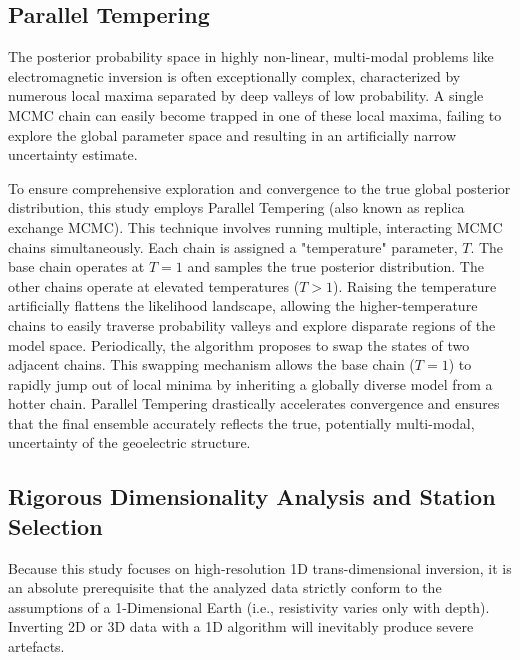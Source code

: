 \subsection{Parallel Tempering}
The posterior probability space in highly non-linear, multi-modal problems like electromagnetic inversion is often exceptionally complex, characterized by numerous local maxima separated by deep valleys of low probability. A single MCMC chain can easily become trapped in one of these local maxima, failing to explore the global parameter space and resulting in an artificially narrow uncertainty estimate.

To ensure comprehensive exploration and convergence to the true global posterior distribution, this study employs Parallel Tempering (also known as replica exchange MCMC). This technique involves running multiple, interacting MCMC chains simultaneously. Each chain is assigned a "temperature" parameter, $T$. The base chain operates at $T=1$ and samples the true posterior distribution. The other chains operate at elevated temperatures ($T > 1$). Raising the temperature artificially flattens the likelihood landscape, allowing the higher-temperature chains to easily traverse probability valleys and explore disparate regions of the model space. Periodically, the algorithm proposes to swap the states of two adjacent chains. This swapping mechanism allows the base chain ($T=1$) to rapidly jump out of local minima by inheriting a globally diverse model from a hotter chain. Parallel Tempering drastically accelerates convergence and ensures that the final ensemble accurately reflects the true, potentially multi-modal, uncertainty of the geoelectric structure.

\subsection{Rigorous Dimensionality Analysis and Station Selection}
Because this study focuses on high-resolution 1D trans-dimensional inversion, it is an absolute prerequisite that the analyzed data strictly conform to the assumptions of a 1-Dimensional Earth (i.e., resistivity varies only with depth). Inverting 2D or 3D data with a 1D algorithm will inevitably produce severe artefacts.

